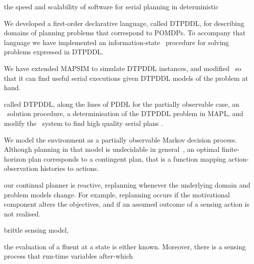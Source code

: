 \documentclass[letterpaper]{article}
\begin{document}
the speed and scalability of software for serial planning in
deterministic




We developed a first-order declarative language, called DTPDDL, for
describing domains of planning problems that correspond to POMDPs.  To
accompany that language we have implemented an information-state
\laostar\ procedure for solving problems expressed in DTPDDL. 

We have extended MAPSIM to simulate DTPDDL instances, and modified
\fastdownward\ so that it can find useful serial executions given
DTPDDL models of the problem at hand.




 called DTPDDL, along
the lines of PDDL for the partially observable case, an \laostar\
solution procedure, a determinisation of the DTPDDL problem in MAPL,
and modify the \fastdownward\ system to find high quality serial plans
.

We model the environment as a partially observable Markov decision
process. Although planning in that model is undecidable in
general~\cite{}, an optimal finite-horizon plan corresponds to a
contingent plan, that is a function mapping action-observation
histories to actions.

our continual planner is reactive, replanning whenever the underlying
domain and problem models change. For example, replanning occurs if
the motivational component alters the objectives, and if an assumed
outcome of a sensing action is not realised.

brittle sensing model, 

the evaluation of a fluent at a state is either known. Moreover, there
is a sensing process that run-time variables  after-which 




\end{document}
